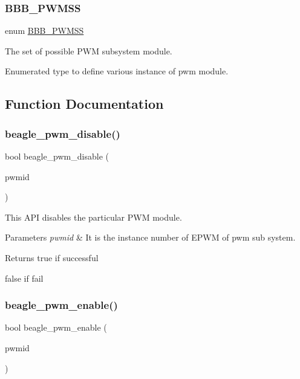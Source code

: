 \subsubsection{\texorpdfstring{BBB\_PWMSS}{BBB\_PWMSS}}
{\footnotesize\ttfamily enum \mbox{\hyperlink{bbb-pwm_8h_a8e1f51037d4bbe9c36217634f75a628e}{B\+B\+B\+\_\+\+P\+W\+M\+SS}}}



The set of possible P\+WM subsystem module. 

Enumerated type to define various instance of pwm module. 

\subsection{Function Documentation}
\mbox{\label{bbb-pwm_8h_a04c3bc9942822930b25a1882f14e02ef}} 
\subsubsection{\texorpdfstring{beagle\_pwm\_disable()}{beagle\_pwm\_disable()}}
{\footnotesize\ttfamily bool beagle\+\_\+pwm\+\_\+disable (\begin{DoxyParamCaption}\item[{\mbox{\hyperlink{bbb-pwm_8h_a8e1f51037d4bbe9c36217634f75a628e}{B\+B\+B\+\_\+\+P\+W\+M\+SS}}}]{pwmid }\end{DoxyParamCaption})}



This A\+PI disables the particular P\+WM module. 


\begin{DoxyParams}{Parameters}
{\em pwmid} & It is the instance number of E\+P\+WM of pwm sub system.\\
\hline
\end{DoxyParams}
\begin{DoxyReturn}{Returns}
true if successful 

false if fail 
\end{DoxyReturn}
\mbox{\label{bbb-pwm_8h_a0a1b5e73110b79efb7cee71b7d681b98}} 
\subsubsection{\texorpdfstring{beagle\_pwm\_enable()}{beagle\_pwm\_enable()}}
{\footnotesize\ttfamily bool beagle\+\_\+pwm\+\_\+enable (\begin{DoxyParamCaption}\item[{\mbox{\hyperlink{bbb-pwm_8h_a8e1f51037d4bbe9c36217634f75a628e}{B\+B\+B\+\_\+\+P\+W\+M\+SS}}}]{pwmid }\end{DoxyParamCaption})}



